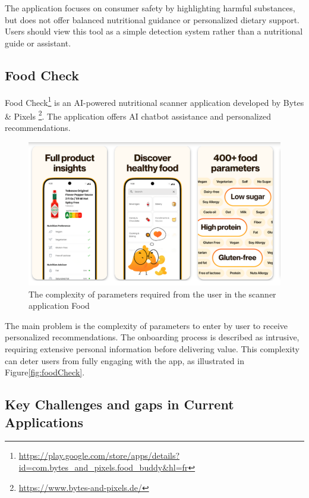 \par The application focuses on consumer safety by highlighting
harmful substances, but does not offer balanced nutritional guidance or
personalized dietary support. Users should view this tool as a simple
detection system rather than a nutritional guide or assistant.


\subsection{Food Check}
Food Check\footnote{\url{https://play.google.com/store/apps/details?id=com.bytes_and_pixels.food_buddy&hl=fr}} is an AI-powered nutritional scanner application developed by 
Bytes \& Pixels \footnote{\url{https://www.bytes-and-pixels.de/}}. The application offers AI chatbot assistance and personalized recommendations.

\begin{figure}[H]
\centering
\includegraphics[scale=0.45]{images/food_check.png}
\caption{The complexity of parameters required from the user in the scanner application Food}
\label{fig:foofCheck}
\end{figure}

The main problem is the complexity of parameters to enter by user
to receive personalized recommendations. The onboarding process is
described as intrusive, requiring extensive personal information before
delivering value. This complexity can deter users from fully engaging
with the app, as illustrated in Figure\ref{fig:foodCheck}.

\subsection{Key Challenges and gaps in Current Applications}

